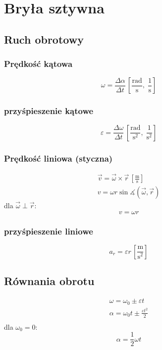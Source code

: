 \documentclass{report}
\numberwithin{equation}{chapter}
\newcommand{\unit}[1]{\,\left[\mathrm{#1}\right]}
\begin{document}
  \newpage
  \chapter{Bryła sztywna}
    \section{Ruch obrotowy}
      \subsection{Prędkość kątowa}
        \begin{equation}
          \omega = \frac{\Delta\alpha}{\Delta t} \unit{\frac{rad}{s},\;\frac{1}{s}}
        \end{equation}
      \subsection{przyśpieszenie kątowe}
        \begin{equation}
          \varepsilon = \frac{\Delta\omega}{\Delta t} \unit{\frac{rad}{s^2},\;\frac{1}{s^2}}
        \end{equation}
      \subsection{Prędkość liniowa (styczna)}
        \begin{gather}
          \vec v = \vec\omega \times \vec r\unit{\frac{m}{s}}\\
          v = \omega r\sin\measuredangle(\vec\omega, \vec r)
        \end{gather}
        dla $\vec\omega \perp \vec r$:
        \begin{equation}
          v =\omega r
        \end{equation}
      \subsection{przyśpieszenie liniowe}
        \begin{equation}
          a_r = \varepsilon r \unit{\frac{m}{s^2}}
        \end{equation}
      \section{Równania obrotu}
        \begin{gather}
          \omega = \omega_0 \pm \varepsilon t\\
          \alpha = \omega_0t \pm \frac{\varepsilon t^2}{2}\\
        \end{gather}
        dla $\omega_0 = 0$:
        \begin{equation}
          \alpha = \frac{1}{2} \omega t
        \end{equation}
\end{document}
